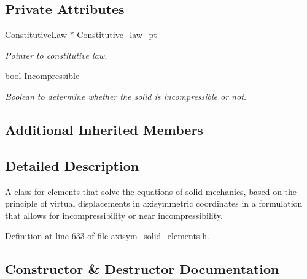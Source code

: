 \subsection*{Private Attributes}
\begin{DoxyCompactItemize}
\item 
\hyperlink{classoomph_1_1ConstitutiveLaw}{Constitutive\+Law} $\ast$ \hyperlink{classoomph_1_1AxisymmetricPVDEquationsWithPressure_a792ad265951fa647ca47d4a71b1df02f}{Constitutive\+\_\+law\+\_\+pt}
\begin{DoxyCompactList}\small\item\em Pointer to constitutive law. \end{DoxyCompactList}\item 
bool \hyperlink{classoomph_1_1AxisymmetricPVDEquationsWithPressure_a2ceef4a0290f5b475c99dd26721659d0}{Incompressible}
\begin{DoxyCompactList}\small\item\em Boolean to determine whether the solid is incompressible or not. \end{DoxyCompactList}\end{DoxyCompactItemize}
\subsection*{Additional Inherited Members}


\subsection{Detailed Description}
A class for elements that solve the equations of solid mechanics, based on the principle of virtual displacements in axisymmetric coordinates in a formulation that allows for incompressibility or near incompressibility. 

Definition at line 633 of file axisym\+\_\+solid\+\_\+elements.\+h.



\subsection{Constructor \& Destructor Documentation}
\mbox{\label{classoomph_1_1AxisymmetricPVDEquationsWithPressure_a70d70c4f5629ef9479c4530d10828891}} 
